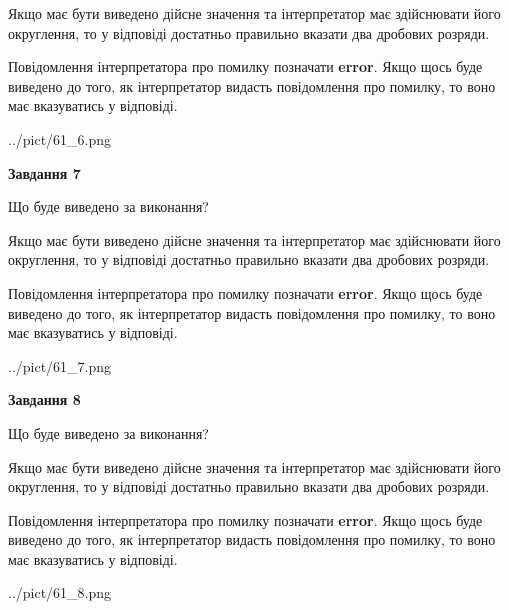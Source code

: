 \documentclass[12pt, ukrainian]{article}
\begin{document}
{\begin {Large}
Якщо має бути виведено дійсне значення та інтерпретатор має здійснювати його округлення, 
то у відповіді достатньо правильно вказати два дробових розряди.

Повідомлення інтерпретатора про помилку позначати \textbf{error}.
Якщо щось буде виведено до того, як інтерпретатор видасть повідомлення про помилку, 
то воно має вказуватись у відповіді. \par

\begin{center}
	{../pict/61_6.png}
\end{center}
\newpage

{\begin {center}\textbf{Завдання 7}\end {center}}\par
Що буде виведено за виконання? \par

Якщо має бути виведено дійсне значення та інтерпретатор має здійснювати його округлення, 
то у відповіді достатньо правильно вказати два дробових розряди.

Повідомлення інтерпретатора про помилку позначати \textbf{error}.
Якщо щось буде виведено до того, як інтерпретатор видасть повідомлення про помилку, 
то воно має вказуватись у відповіді. \par

\begin{center}
	{../pict/61_7.png}
\end{center}
\newpage

{\begin {center}\textbf{Завдання 8}\end {center}}\par
Що буде виведено за виконання? \par

Якщо має бути виведено дійсне значення та інтерпретатор має здійснювати його округлення, 
то у відповіді достатньо правильно вказати два дробових розряди.

Повідомлення інтерпретатора про помилку позначати \textbf{error}.
Якщо щось буде виведено до того, як інтерпретатор видасть повідомлення про помилку, 
то воно має вказуватись у відповіді. \par

\begin{center}
	{../pict/61_8.png}
\end{center}
\newpage


\end{Large}}
\end{document}
